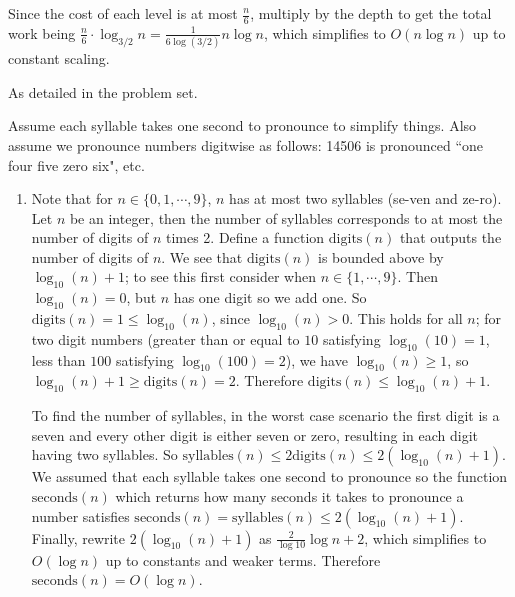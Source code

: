 \begin{solution}
\begin{enumerate}[label=(\alph*)]
Since the cost of each level is at most $\frac{n}{6}$, multiply by the depth to get the total work being $\frac{n}{6}\cdot \log_{3/ 2}n=\frac{1}{6 \log(3 /2)}n\log n$, which simplifies to $O(n \log n)$ up to constant scaling.
    \end{enumerate}
\end{solution}

\begin{prob}
    As detailed in the problem set.
\end{prob}
\begin{solution}
    Assume each syllable takes one second to pronounce to simplify things. Also assume we pronounce numbers digitwise as follows: 14506 is pronounced ``one four five zero six", etc.
    \begin{enumerate}[label=(\alph*)]
    \setlength\itemsep{-.2em}
\item Note that for $n \in \{0,1,\cdots ,9\} $, $n$ has at most two syllables (se-ven and ze-ro). Let $n$ be an integer, then the number of syllables corresponds to at most the number of digits of $n$ times 2. Define a function $\mathrm{digits}(n)$ that outputs the number of digits of $n$. We see that $\mathrm{digits}(n) $ is bounded above by $\log_{10}(n)+1$; to see this first consider when $n \in \{1, \cdots ,9\} $. Then $\log_{10}(n)=0$, but $n$ has one digit so we add one. So $\mathrm{digits}(n)=1\leq \log_{10}(n)$, since $\log_{10}(n)>0$. This holds for all $n$; for two digit numbers (greater than or equal to $10$ satisfying $\log_{10}(10)=1$, less than $100$ satisfying $\log_{10}(100)=2$), we have $\log_{10}(n)\geq 1$, so $\log_{10}(n)+1 \geq \mathrm{digits}(n)=2$. Therefore $\mathrm{digits}(n)\leq \log_{10}(n)+1$.  

    To find the number of syllables, in the worst case scenario the first digit is a seven and every other digit is either seven or zero, resulting in each digit having two syllables. So $\mathrm{syllables}(n)\leq 2 \mathrm{digits}(n) \leq 2(\log_{10}(n)+1)$. We assumed that each syllable takes one second to pronounce so the function $\mathrm{seconds}(n)$ which returns how many seconds it takes to pronounce a number satisfies $\mathrm{seconds}(n)=\mathrm{syllables}(n) \leq 2(\log_{10}(n)+1)$. Finally, rewrite $2(\log_{10}(n)+1)$ as $\frac{2}{\log 10}\log n+2$, which simplifies to $O(\log n)$ up to constants and weaker terms. Therefore $\mathrm{seconds}(n)=O(\log n)$.


\end{enumerate}
\end{solution}
